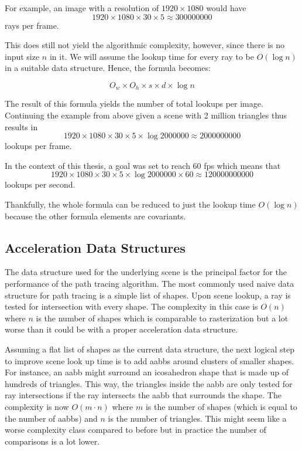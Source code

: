 \documentclass[
  twoside,
  11pt, a4paper,
  footinclude=true,
  headinclude=true,
  cleardoublepage=empty
]{scrreprt}
\begin{document}
For example, an image with a resolution of \(1920 \times 1080\)
would have \[1920 \times 1080 \times 30 \times 5 \approx \num{300000000}\] rays per frame.

This does still not yield the algorithmic complexity, however, since there is no input size \(n\)
in it. We will assume the lookup time for every ray to be \(O(\log n)\) in a suitable data
structure. Hence, the formula becomes:

\[ O_w \times O_h \times s \times d \times \log n \]

The result of this formula yields the number of total lookups per image.
Continuing the example from above given a scene with 2 million triangles thus results in
\[1920 \times 1080 \times 30 \times 5 \times \log \num{2000000} \approx \num{2000000000}\]
lookups per frame.

In the context of this thesis, a goal was set to reach 60 \ac{fps} which means that
\[1920 \times 1080 \times 30 \times 5 \times \log \num{2000000} \times 60 \approx \num{120000000000}\]
lookups per second.

Thankfully, the whole formula can be reduced to just the lookup time \(O(\log n)\) because the other
formula elements are covariants.

\subsection{Acceleration Data Structures}
The data structure used for the underlying scene is the principal factor for the performance of the
path tracing algorithm. The most commonly used naive data structure for path tracing is a simple
list of shapes. Upon scene lookup, a ray is tested for intersection with every shape. The
complexity in this case is \(O(n)\) where \(n\) is the number of shapes which is comparable to rasterization but a lot worse than it
could be with a proper acceleration data structure.

Assuming a flat list of shapes as the current data structure, the next logical step to improve
scene look up time is to add \acp{aabb} around clusters of smaller shapes. For instance, an
\ac{aabb} might surround an icosahedron shape that is made up of hundreds of triangles. This way,
the triangles inside the \ac{aabb} are only tested for ray intersections if the ray intersects the
\ac{aabb} that surrounds the shape. The complexity is now \(O(m \cdot n)\) where \(m\) is the number
of shapes (which is equal to the number of \acp{aabb}) and \(n\) is the number of triangles. This
might seem like a worse complexity class compared to before but in practice the number of
comparisons is a lot lower.
\end{document}

